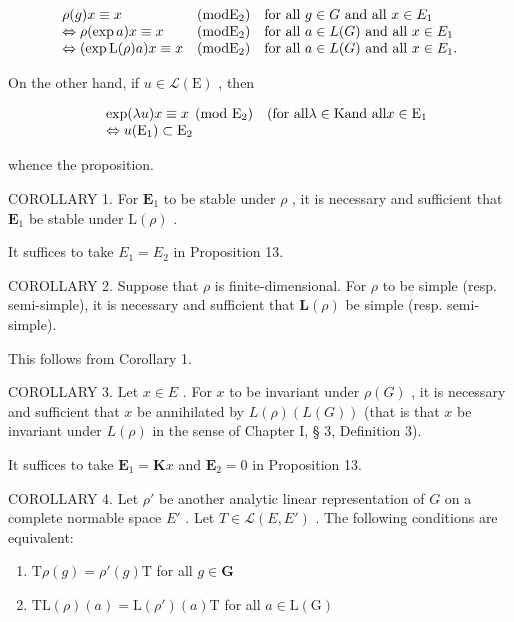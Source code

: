 \[
\begin{array}{l l l} \rho (g) x \equiv x & (\mathrm{mod} \mathrm{E} _ {2}) & \text {for all \(g\in G\) and all \(x\in E_{1}\)} \\ \Leftrightarrow \rho (\exp a) x \equiv x & (\mathrm{mod} \mathrm{E} _ {2}) & \text {for all \(a\in L(G)\) and all \(x\in E_{1}\)} \\ \Leftrightarrow (\exp \mathrm{L} (\rho) a) x \equiv x & (\mathrm{mod} \mathrm{E} _ {2}) & \text {for all \(a\in L(G)\) and all \(x\in E_{1}\)}. \end{array}
\]

On the other hand, if \(u \in \mathcal{L}(\mathrm{E})\) , then

\[
\begin{array}{r l} & \exp (\lambda u) x \equiv x \pmod {\mathrm{E} _ {2}} \quad \text {(for all} \lambda \in \mathrm{K} \text {and all} x \in \mathrm{E} _ {1} \\ & \Leftrightarrow u (\mathrm{E} _ {1}) \subset \mathrm{E} _ {2} \end{array}
\]

whence the proposition.

COROLLARY 1. For \(\mathbf{E}_1\) to be stable under \(\rho\) , it is necessary and sufficient that \(\mathbf{E}_1\) be stable under \(\mathrm{L}(\rho)\) .

It suffices to take \(E_{1} = E_{2}\) in Proposition 13.

COROLLARY 2. Suppose that \(\rho\) is finite-dimensional. For \(\rho\) to be simple (resp. semi-simple), it is necessary and sufficient that \(\mathbf{L}(\rho)\) be simple (resp. semi-simple).

This follows from Corollary 1.

COROLLARY 3. Let \(x \in E\) . For \(x\) to be invariant under \(\rho(G)\) , it is necessary and sufficient that \(x\) be annihilated by \(L(\rho)(L(G))\) (that is that \(x\) be invariant under \(L(\rho)\) in the sense of Chapter I, § 3, Definition 3).

It suffices to take \(\mathbf{E}_1 = \mathbf{K}x\) and \(\mathbf{E}_2 = 0\) in Proposition 13.

COROLLARY 4. Let \(\rho'\) be another analytic linear representation of \(G\) on a complete normable space \(E'\) . Let \(T \in \mathcal{L}(E, E')\) . The following conditions are equivalent:

\begin{enumerate}
\def\labelenumi{(\roman{enumi})}
\item
  \(\mathrm{T}\rho (g) = \rho '(g)\mathrm{T}\) for all \(g\in \mathbf{G}\)
\item
  \(\mathrm{TL}(\rho)(a) = \mathrm{L}(\rho')(a)\mathrm{T}\) for all \(a\in \mathrm{L}(\mathrm{G})\)
\end{enumerate}

